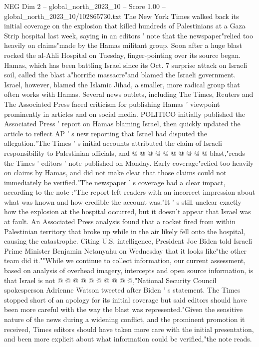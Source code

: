 \begin{textsample}{NEG Dim 2 – global\_north\_2023\_10 – Score 1.00 – global\_north\_2023\_10/102865730.txt}  \label{ex:f2_neg_165}
The New York Times walked back its initial coverage on the explosion that killed hundreds of Palestinians at a Gaza Strip hospital last week, saying in an editors ' note that the newspaper"relied too heavily on claims"made by the Hamas militant group.
Soon after a huge blast rocked the al-Ahli Hospital on Tuesday, finger-pointing over its source began.
Hamas, which has been battling Israel since its Oct. 7 surprise attack on Israeli soil, called the blast a"horrific massacre"and blamed the Israeli government.
Israel, however, blamed the Islamic Jihad, a smaller, more radical group that often works with Hamas.
Several news outlets, including The Times, Reuters and The Associated Press faced criticism for publishing Hamas ' viewpoint prominently in articles and on social media.
POLITICO initially published the Associated Press ' report on Hamas blaming Israel, then quickly updated the article to reflect AP ' s new reporting that Israel had disputed the allegation."The Times ' s initial accounts attributed the claim of Israeli responsibility to Palestinian officials, and @ @ @ @ @ @ @ @ @ @ blast,"reads the Times ' editors ' note published on Monday.
Early coverage"relied too heavily on claims by Hamas, and did not make clear that those claims could not immediately be verified."The newspaper ' s coverage had a clear impact, according to the note :"The report left readers with an incorrect impression about what was known and how credible the account was."It ' s still unclear exactly how the explosion at the hospital occurred, but it doesn't appear that Israel was at fault.
An Associated Press analysis found that a rocket fired from within Palestinian territory that broke up while in the air likely fell onto the hospital, causing the catastrophe.
Citing U.S. intelligence, President Joe Biden told Israeli Prime Minister Benjamin Netanyahu on Wednesday that it looks like"the other team did it.""While we continue to collect information, our current assessment, based on analysis of overhead imagery, intercepts and open source information, is that Israel is not @ @ @ @ @ @ @ @ @ @,"National Security Council spokesperson Adrienne Watson tweeted after Biden ' s statement.
The Times stopped short of an apology for its initial coverage but said editors should have been more careful with the way the blast was represented."Given the sensitive nature of the news during a widening conflict, and the prominent promotion it received, Times editors should have taken more care with the initial presentation, and been more explicit about what information could be verified,"the note reads.

\end{textsample}
